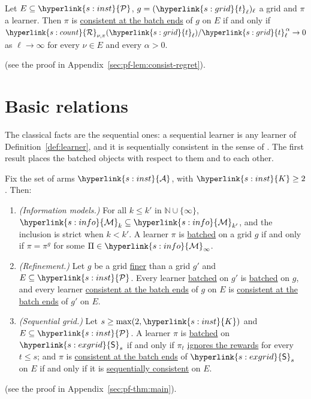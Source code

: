 \documentclass[11pt]{article}
\newcommand{\sy}[2]{{\hyperlink{#1}{#2}}}
\newcommand{\term}[2]{\hyperlink{#1}{#2}}
\newcommand{\1}{\mathbf{1}}
\newcommand{\Nat}{\mathbb{N}}
\newcommand{\Arms}{\sy{s:inst}{\mathcal A}}
\newcommand{\Kar}{\sy{s:inst}{K}}
\newcommand{\cP}{\sy{s:inst}{\mathcal P}}
\newcommand{\Reg}{\sy{s:count}{\mathcal R}}
\newcommand{\tl}{\sy{s:grid}{t}}
\newcommand{\Sq}{\sy{s:exgrid}{\mathsf S}}
\newcommand{\Mk}[1]{\sy{s:info}{\mathcal M}_{#1}}
\newcommand{\ignores}{\term{t:sees}{ignores the rewards}}
\newcommand{\batched}{\term{t:batched}{batched}}
\newcommand{\consistent}{\term{t:cons}{consistent at the batch ends}}
\newcommand{\seqcons}{\term{t:seqc}{sequentially consistent}}
\newcommand{\finer}{\term{t:finer}{finer}}
\begin{document}
\begin{lemma}\label{lem:consist-regret}
Let $E\subseteq\cP$, $g=(\tl_\ell)_\ell$ a grid and $\pi$ a learner. Then $\pi$ is \consistent{} of $g$ on $E$
if and only if $\Reg_{\nu,\pi}(\tl_\ell)/\tl_\ell^{\,\alpha}\to0$ as $\ell\to\infty$ for every
$\nu\in E$ and every $\alpha>0$.
\end{lemma}
(see the proof in Appendix~\ref{sec:pf-lem:consist-regret}).

\section{Basic relations}\label{sec:main}

The classical facts are the sequential ones: a sequential learner is any learner of
Definition~\ref{def:learner}, and it is sequentially consistent in the sense of
\citet[Definition~16.1]{LS}. The first result places the batched objects with respect to them and
to each other.

\begin{theorem}\label{thm:main}
Fix the set of arms $\Arms$, with $\Kar\ge2$. Then:
\begin{enumerate}[label=(\roman*)]
\item \emph{(Information models.)} For all $k\le k'$ in $\Nat\cup\{\infty\}$,
  $\Mk{k}\subseteq\Mk{k'}$, and the inclusion is strict when $k<k'$. A learner $\pi$ is \batched{}
  on a grid $g$ if and only if $\pi=\pi^g$ for some $\Pi\in\Mk{\infty}$.
\item \emph{(Refinement.)} Let $g$ be a grid \finer{} than a grid $g'$ and $E\subseteq\cP$. Every
  learner \batched{} on $g'$ is \batched{} on $g$, and every learner \consistent{} of $g$ on $E$ is
  \consistent{} of $g'$ on $E$.
\item \emph{(Sequential grid.)} Let $s\ge\max(2,\Kar)$ and $E\subseteq\cP$. A learner $\pi$ is
  \batched{} on $\Sq_s$ if and only if $\pi_t$ \ignores{} for every $t\le s$; and $\pi$ is
  \consistent{} of $\Sq_s$ on $E$ if and only if it is \seqcons{} on $E$.
\end{enumerate}
\end{theorem}
(see the proof in Appendix~\ref{sec:pf-thm:main}).
\end{document}
